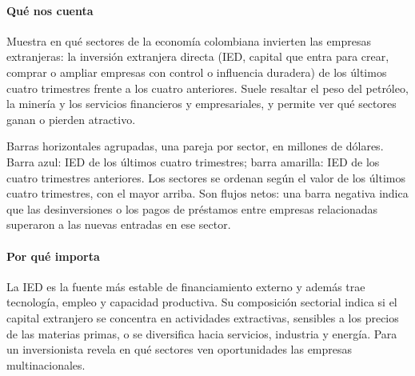 \paragraph{Qué nos cuenta}
Muestra en qué sectores de la economía colombiana invierten las empresas extranjeras: la inversión extranjera directa (IED, capital que entra para crear, comprar o ampliar empresas con control o influencia duradera) de los últimos cuatro trimestres frente a los cuatro anteriores. Suele resaltar el peso del petróleo, la minería y los servicios financieros y empresariales, y permite ver qué sectores ganan o pierden atractivo.

\begin{leer}
Barras horizontales agrupadas, una pareja por sector, en millones de dólares. Barra azul: IED de los últimos cuatro trimestres; barra amarilla: IED de los cuatro trimestres anteriores. Los sectores se ordenan según el valor de los últimos cuatro trimestres, con el mayor arriba. Son flujos netos: una barra negativa indica que las desinversiones o los pagos de préstamos entre empresas relacionadas superaron a las nuevas entradas en ese sector.
\end{leer}

\paragraph{Por qué importa}
La IED es la fuente más estable de financiamiento externo y además trae tecnología, empleo y capacidad productiva. Su composición sectorial indica si el capital extranjero se concentra en actividades extractivas, sensibles a los precios de las materias primas, o se diversifica hacia servicios, industria y energía. Para un inversionista revela en qué sectores ven oportunidades las empresas multinacionales.


